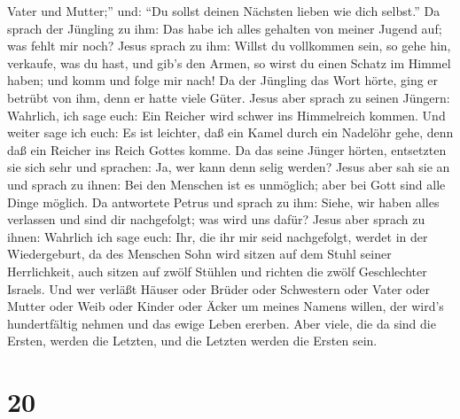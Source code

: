 Vater und Mutter;'' und: ``Du sollst deinen Nächsten lieben wie dich
selbst.''  Da sprach der Jüngling zu ihm: Das habe ich
alles gehalten von meiner Jugend auf; was fehlt mir noch? 
Jesus sprach zu ihm: Willst du vollkommen sein, so gehe hin, verkaufe,
was du hast, und gib's den Armen, so wirst du einen Schatz im Himmel
haben; und komm und folge mir nach!  Da der Jüngling das
Wort hörte, ging er betrübt von ihm, denn er hatte viele Güter.
 Jesus aber sprach zu seinen Jüngern: Wahrlich, ich sage
euch: Ein Reicher wird schwer ins Himmelreich kommen.  Und
weiter sage ich euch: Es ist leichter, daß ein Kamel durch ein Nadelöhr
gehe, denn daß ein Reicher ins Reich Gottes komme.  Da das
seine Jünger hörten, entsetzten sie sich sehr und sprachen: Ja, wer kann
denn selig werden?  Jesus aber sah sie an und sprach zu
ihnen: Bei den Menschen ist es unmöglich; aber bei Gott sind alle Dinge
möglich.  Da antwortete Petrus und sprach zu ihm: Siehe,
wir haben alles verlassen und sind dir nachgefolgt; was wird uns dafür?
 Jesus aber sprach zu ihnen: Wahrlich ich sage euch: Ihr,
die ihr mir seid nachgefolgt, werdet in der Wiedergeburt, da des
Menschen Sohn wird sitzen auf dem Stuhl seiner Herrlichkeit, auch sitzen
auf zwölf Stühlen und richten die zwölf Geschlechter Israels.
 Und wer verläßt Häuser oder Brüder oder Schwestern oder
Vater oder Mutter oder Weib oder Kinder oder Äcker um meines Namens
willen, der wird's hundertfältig nehmen und das ewige Leben ererben.
 Aber viele, die da sind die Ersten, werden die Letzten,
und die Letzten werden die Ersten sein.

\hypertarget{section-19}{%
\section{20}\label{section-19}}

